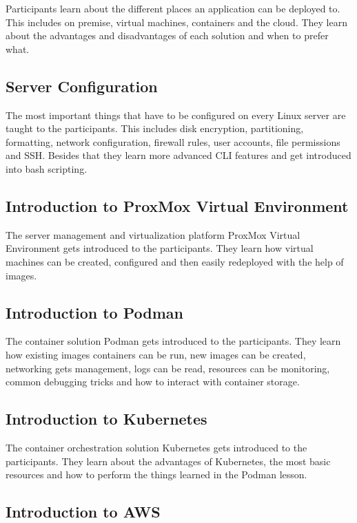 \documentclass{article}
\begin{document}
Participants learn about the different places an application can be deployed to.
This includes on premise, virtual machines, containers and the cloud. They learn
about the advantages and disadvantages of each solution and when to prefer what.

\subsection{Server Configuration}

The most important things that have to be configured on every Linux server are
taught to the participants. This includes disk encryption, partitioning,
formatting, network configuration, firewall rules, user accounts, file
permissions and SSH. Besides that they learn more advanced CLI features and get
introduced into bash scripting.

\subsection{Introduction to ProxMox Virtual Environment}

The server management and virtualization platform ProxMox Virtual Environment
gets introduced to the participants. They learn how virtual machines can be
created, configured and then easily redeployed with the help of images.

\subsection{Introduction to Podman}

The container solution Podman gets introduced to the participants. They learn
how existing images containers can be run, new images can be created, networking
gets management, logs can be read, resources can be monitoring, common debugging
tricks and how to interact with container storage.

\subsection{Introduction to Kubernetes}

The container orchestration solution Kubernetes gets introduced to the
participants. They learn about the advantages of Kubernetes, the most basic
resources and how to perform the things learned in the Podman lesson.

\subsection{Introduction to AWS}
\end{document}
